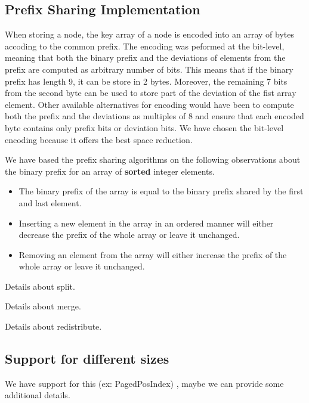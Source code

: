 \documentclass[11pt,a4paper,oneside]{article}
\begin{document}

\subsection{Prefix Sharing Implementation} %
\label{sub:prefix_sharing_rebalancing}
When storing a node, the key array of a node is encoded into an array of bytes accoding to the common prefix. The encoding was peformed at the bit-level, meaning that both the binary prefix and the deviations of elements from the prefix are computed as arbitrary number of bits. This means that if the binary prefix has length 9, it can be store in 2 bytes. Moreover, the remaining 7 bits from the second byte can be used to store part of the deviation of the fist array element. Other available alternatives for encoding would have been to compute both the prefix and the deviations as multiples of 8 and ensure that each encoded byte contains only prefix bits or deviation bits. We have chosen the bit-level encoding because it offers the best space reduction.

We have based the prefix sharing algorithms on the following observations about the binary prefix for an array of \textbf{sorted} integer elements.
\begin{itemize}
	\item The binary prefix of the array is equal to the binary prefix shared by the first and last element.
	\item Inserting a new element in the array in an ordered manner will either decrease the prefix of the whole array or leave it unchanged.
	\item Removing an element from the array will either increase the prefix of the whole array or leave it unchanged.
\end{itemize}

Details about split.

Details about merge.

Details about redistribute.

\subsection{Support for different sizes}
We have support for this (ex: PagedPosIndex) , maybe we can provide some additional details.


\end{document}
